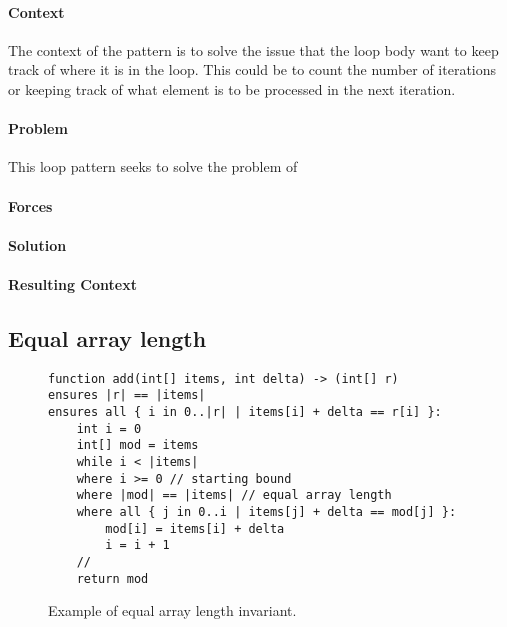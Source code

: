 
\paragraph{Context} 

The context of the pattern is to solve the issue that the loop 
body want to keep track of where it is in the loop.
This could be to count the number of iterations or keeping track
of what element is to be processed in the next iteration.

\paragraph{Problem}

This loop pattern seeks to solve the problem of 

\paragraph{Forces}

\paragraph{Solution}

\paragraph{Resulting Context}


\subsection{Equal array length}


\begin{figure}[ht]
\begin{lstlisting}
function add(int[] items, int delta) -> (int[] r)
ensures |r| == |items|
ensures all { i in 0..|r| | items[i] + delta == r[i] }:
    int i = 0
    int[] mod = items
    while i < |items|
    where i >= 0 // starting bound
    where |mod| == |items| // equal array length
    where all { j in 0..i | items[j] + delta == mod[j] }:
        mod[i] = items[i] + delta
        i = i + 1
    //
    return mod
\end{lstlisting}
\caption{Example of equal array length invariant.}
\label{lst:starting-bound-rev}
\end{figure}


